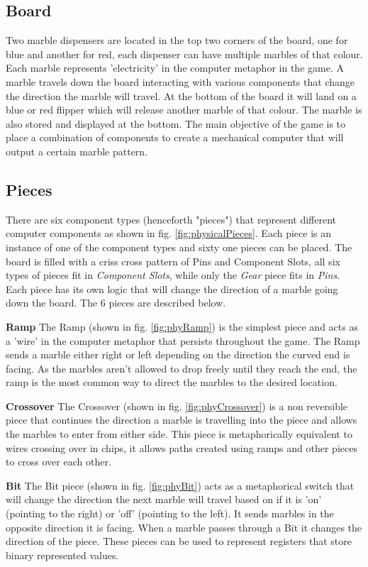 \documentclass{l4proj}
\begin{document}
\subsection{Board}
Two marble dispensers are located in the top two corners of the board, one for blue and another for red, each dispenser can have multiple marbles of that colour. Each marble represents 'electricity' in the computer metaphor in the game. A marble travels down the board interacting with various components that change the direction the marble will travel. At the bottom of the board it will land on a blue or red flipper which will release another marble of that colour. The marble is also stored and displayed at the bottom. The main objective of the game is to place a combination of components to create a mechanical computer that will output a certain marble pattern.



\subsection{Pieces}
\label{section:background-pieces}
There are six component types (henceforth "pieces") that represent different computer components as shown in fig. \ref{fig:physicalPieces}. Each piece is an instance of one of the component types and sixty one pieces can be placed. The board is filled with a criss cross pattern of Pins and Component Slots, all six types of pieces fit in \emph{Component Slots}, while only the \emph{Gear} piece fits in \emph{Pins}. Each piece has its own logic that will change the direction of a marble going down the board. The 6 pieces are described below.

\textbf{Ramp}
The Ramp (shown in fig. \ref{fig:phyRamp}) is the simplest piece and acts as a 'wire' in the computer metaphor that persists throughout the game. The Ramp sends a marble either right or left depending on the direction the curved end is facing. As the marbles aren't allowed to drop freely until they reach the end, the ramp is the most common way to direct the marbles to the desired location.

\textbf{Crossover}
The Crossover (shown in fig. \ref{fig:phyCrossover}) is a non reversible piece that continues the direction a marble is travelling into the piece and allows the marbles to enter from either side. This piece is metaphorically equivalent to wires crossing over in chips, it allows paths created using ramps and other pieces to cross over each other.

\textbf{Bit}
The Bit piece (shown in fig. \ref{fig:phyBit}) acts as a metaphorical switch that will change the direction the next marble will travel based on if it is 'on' (pointing to the right) or 'off' (pointing to the left). It sends marbles in the opposite direction it is facing. When a marble passes through a Bit it changes the direction of the piece. These pieces can be used to represent registers that store binary represented values.
\end{document}
